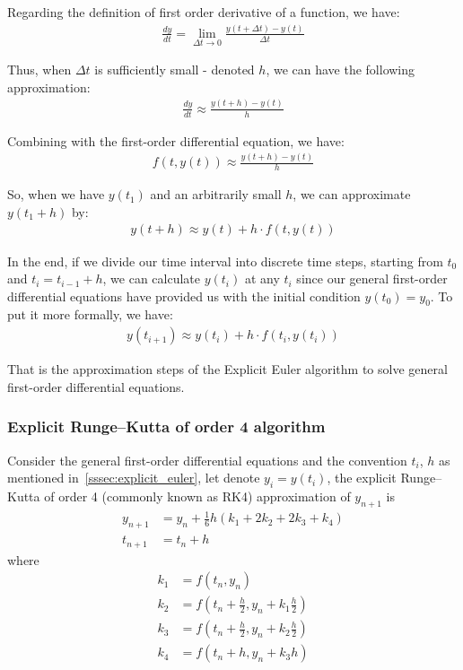 \documentclass[a4paper]{article}
\numberwithin{equation}{section}
\begin{document}
Regarding the definition of first order derivative of a function, we have:
\begin{align*}
  \frac{dy}{dt} = \lim_{\Delta t \rightarrow 0} \frac{y(t + \Delta t) - y(t)}{\Delta t}
\end{align*}

Thus, when \(\Delta t\) is sufficiently small - denoted \(h\), we can have the following approximation:
\begin{align*}
  \frac{dy}{dt} \approx \frac{y(t + h) - y(t)}{h}
\end{align*}

Combining with the first-order differential equation, we have:
\begin{align*}
  f(t,y(t)) \approx \frac{y(t + h) - y(t)}{h}
\end{align*}

So, when we have \(y(t_1)\) and an arbitrarily small \(h\), we can approximate \(y(t_1 + h)\) by:
\begin{align*}
  y(t + h) \approx y(t) + h \cdot f(t,y(t))
\end{align*}

In the end, if we divide our time interval into discrete time steps, starting from \(t_0\) and \(t_i = t_{i-1} + h\), we can calculate \(y(t_i)\) at any \(t_i\) since our general first-order differential equations have provided us with the initial condition \(y(t_0) = y_0\). To put it more formally, we have:
\begin{align*}
  y(t_{i+1}) \approx y(t_i) + h \cdot f(t_i, y(t_i))
\end{align*}

That is the approximation steps of the Explicit Euler algorithm to solve general first-order differential equations.

\subsubsection{Explicit Runge–Kutta of order 4 algorithm}
Consider the general first-order differential equations and the convention \(t_i\), \(h\) as mentioned in~\ref{sssec:explicit_euler}, let denote \(y_i = y(t_i)\), the explicit Runge–Kutta of order 4 (commonly known as RK4) approximation of \(y_{n+1}\) is
\begin{align*}
  y_{n+1} & = y_n + \frac{1}{6}h(k_1 + 2k_2 + 2k_3 + k_4) \\
  t_{n+1} & = t_n + h
\end{align*}
where
\begin{align*}
  k_1 & = f(t_n, y_n)                                            \\
  k_2 & = f \left(t_n + \frac{h}{2}, y_n + k_1\frac{h}{2}\right) \\
  k_3 & = f \left(t_n + \frac{h}{2}, y_n + k_2\frac{h}{2}\right) \\
  k_4 & = f(t_n + h, y_n + k_3h)
\end{align*}
\end{document}
